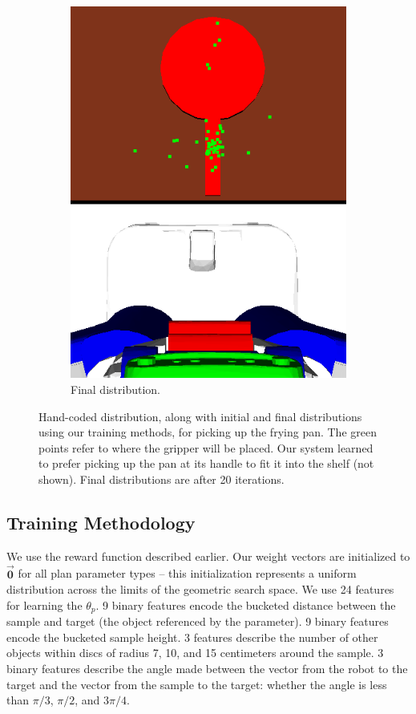 \begin{figure}[h!]
\begin{subfigure}[b]{0.25\linewidth}
    \includegraphics[width=\textwidth]{images/frying_final.png}
    \caption{Final distribution.}
  \end{subfigure}
  \caption{\small{Hand-coded distribution, along with initial and final distributions using our training methods,
for picking up the frying pan. The green points refer to where the gripper will be placed. Our system learned to prefer picking up the pan at its handle to fit it into the shelf (not shown). Final distributions are after 20 iterations.}}
  \label{fig:frying}
\end{figure}

\subsection{Training Methodology}
We use the reward function described earlier. Our weight
vectors are initialized to $\vec{\mathbf{0}}$ for all plan parameter types -- this
initialization represents a uniform distribution across the limits of the geometric search space.
We use 24 features for learning the $\theta_{p}$. 9 binary features encode the bucketed distance between the sample
and target (the object referenced by the parameter). 9 binary features encode the bucketed sample height. 3 features
describe the number of other objects within discs of radius 7, 10, and 15 centimeters around the
sample. 3 binary features describe the angle made between the vector from the
robot to the target and the vector from the sample to the target: whether the angle is less than
$\pi/3$, $\pi/2$, and $3\pi/4$.

